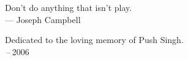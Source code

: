 \thispagestyle{empty}
{}

\vspace*{3cm}

\begin{center}
    Don't do anything that isn't play. \\ \medskip
    --- Joseph Campbell
\end{center}

\medskip

\begin{center}
    Dedicated to the loving memory of Push Singh. \\ \,--\,2006
\end{center}
